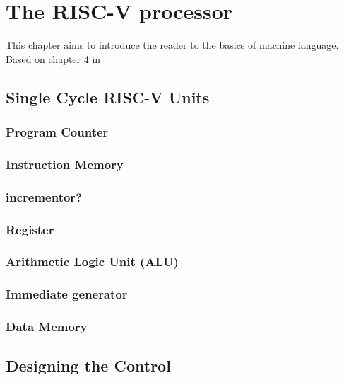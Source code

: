 \chapter{The RISC-V processor}

This chapter aims to introduce the reader to the basics of machine language. Based on chapter 4 in \cite{riscVbook} 

\section{Single Cycle RISC-V Units} 

    \subsection{Program Counter}
    
    \subsection{Instruction Memory}
    
    \subsection{incrementor?} 
    
    \subsection{Register}
    
    \subsection{Arithmetic Logic Unit (ALU)}
    
    \subsection{Immediate generator}
    
    \subsection{Data Memory}
    
\section{Designing the Control}
    
